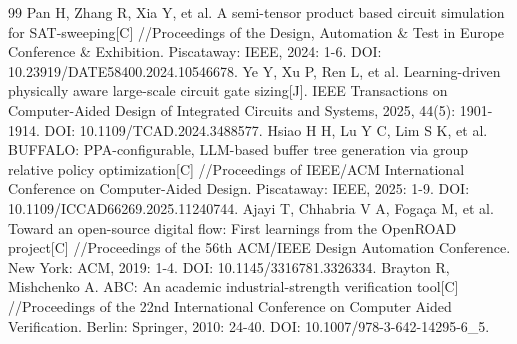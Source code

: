 \documentclass[twocolumn,10pt,fontset=windows]{ctexart}
\begin{document}
\begin{thebibliography}{99}
 Pan H, Zhang R, Xia Y, et al. A semi-tensor product based circuit simulation for SAT-sweeping[C] //Proceedings of the Design, Automation \& Test in Europe Conference \& Exhibition. Piscataway: IEEE, 2024: 1-6. DOI: 10.23919/DATE58400.2024.10546678.
 Ye Y, Xu P, Ren L, et al. Learning-driven physically aware large-scale circuit gate sizing[J]. IEEE Transactions on Computer-Aided Design of Integrated Circuits and Systems, 2025, 44(5): 1901-1914. DOI: 10.1109/TCAD.2024.3488577.
 Hsiao H H, Lu Y C, Lim S K, et al. BUFFALO: PPA-configurable, LLM-based buffer tree generation via group relative policy optimization[C] //Proceedings of IEEE/ACM International Conference on Computer-Aided Design. Piscataway: IEEE, 2025: 1-9. DOI: 10.1109/ICCAD66269.2025.11240744.
 Ajayi T, Chhabria V A, Fogaça M, et al. Toward an open-source digital flow: First learnings from the OpenROAD project[C] //Proceedings of the 56th ACM/IEEE Design Automation Conference. New York: ACM, 2019: 1-4. DOI: 10.1145/3316781.3326334.
 Brayton R, Mishchenko A. ABC: An academic industrial-strength verification tool[C] //Proceedings of the 22nd International Conference on Computer Aided Verification. Berlin: Springer, 2010: 24-40. DOI: 10.1007/978-3-642-14295-6\_5.
\end{thebibliography}
\end{document}
